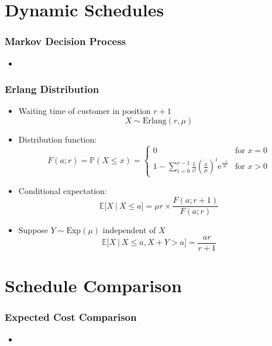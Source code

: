 \documentclass{beamer}
\begin{document}
\section{Dynamic Schedules}

\begin{frame}
	\frametitle{Markov Decision Process}

	\begin{itemize}
		\item 
	\end{itemize}
\end{frame}

\begin{frame}
	\frametitle{Erlang Distribution}

	\begin{itemize}
		\item Waiting time of customer in position $r + 1$
		\begin{equation*}
		 	X \sim \text{Erlang} (r, \mu)
		\end{equation*}
		\item Distribution function:
		\begin{equation*}
			F (a; r) = \mathbb{P} (X \leq x) = \begin{cases} 0 & \text{for $x = 0$} \\ 1 - \sum_{i = 0}^{r - 1} \frac{1}{i!} \left( \frac{x}{\mu} \right)^{i} \mathrm{e}^{\frac{-x}{\mu}} & \text{for $x > 0$} \end{cases}
		\end{equation*}
		\item Conditional expectation:
		\begin{equation*}
			\mathbb{E} \Big[ X \ \big| \ X \leq a \Big] = \mu r \times \frac{F (a; r + 1)}{F (a; r)}
		\end{equation*}
		\item Suppose $Y \sim \text{Exp} (\mu)$ independent of $X$ 
		\begin{equation*}
			\mathbb{E} \Big[ X \ \big| \ X \leq a, X + Y > a \Big] = \frac{a r}{r + 1}
		\end{equation*}
	\end{itemize}
\end{frame}

\section{Schedule Comparison}

\begin{frame}
	\frametitle{Expected Cost Comparison}

	\begin{itemize}
		\item 
	\end{itemize}
\end{frame}
\end{document}
